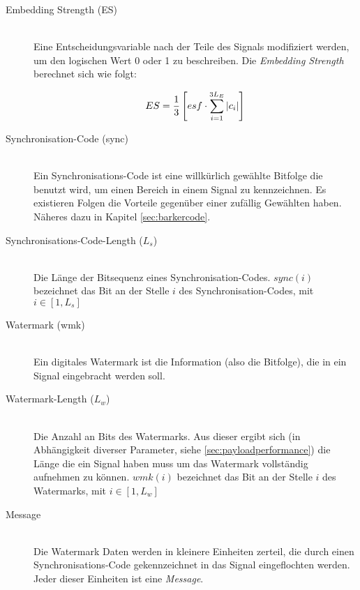 \begin{description}
\item[Embedding Strength (ES)] \hfill \\  
Eine Entscheidungsvariable nach der Teile des Signals modifiziert werden, um den logischen Wert 0 oder 1 zu beschreiben. Die \textit{Embedding Strength} berechnet sich wie folgt:

	\begin{equation}
		ES = {1 \over 3} \left[ esf \cdot \sum\limits_{i=1}^{3{L}_{E}}|c_i| \right] \label{equ:embeddingstrength}
	\end{equation}
		
\item[Synchronisation-Code (sync)] \hfill \\ 
Ein Synchronisations-Code ist eine willk\"urlich gew\"ahlte Bitfolge die benutzt wird, um einen Bereich in einem Signal zu kennzeichnen. Es existieren Folgen die Vorteile gegen\"uber einer zuf\"allig Gew\"ahlten haben. N\"aheres dazu in Kapitel \ref{sec:barkercode}.

\item[Synchronisations-Code-Length (${L}_{s}$)] \hfill \\ 
Die L\"ange der Bitsequenz eines Synchronisation-Codes. $sync(i)$ bezeichnet das Bit an der Stelle $i$ des Synchronisation-Codes, mit $i\in[1,{L}_{s}]$
	
\item[Watermark (wmk)] \hfill \\ 
Ein digitales Watermark ist die Information (also die Bitfolge), die in ein Signal eingebracht werden soll. 

\item[Watermark-Length (${L}_{w}$)] \hfill \\ 
Die Anzahl an Bits des Watermarks. Aus dieser ergibt sich (in Abh\"angigkeit diverser Parameter, siehe \ref{sec:payloadperformance}) die L\"ange die ein Signal haben muss um das Watermark vollst\"andig aufnehmen zu k\"onnen. $wmk(i)$ bezeichnet das Bit an der Stelle $i$ des Watermarks, mit $i\in[1,{L}_{w}]$

\item[Message] \hfill \\ 
Die Watermark Daten werden in kleinere Einheiten zerteil, die durch einen Synchronisations-Code gekennzeichnet in das Signal eingeflochten werden. Jeder dieser Einheiten ist eine \textit{Message}. 
	

\end{description}
